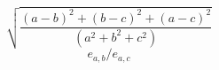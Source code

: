 %

	\begin{equation}
		\sqrt{\dfrac{(a - b)^2 + (b - c)^2 + (a - c)^2}{(a^2 + b^2 + c^2)}}
	\end{equation}
	\begin{equation}
		e_{a, b} / e_{a, c}
	\end{equation}